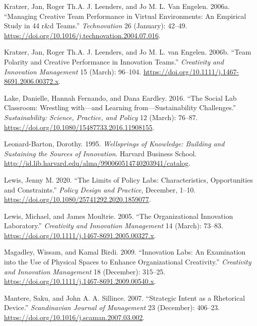 \documentclass[AMA,STIX1COL,APA,STIX2COL]{WileyNJD-v2}
\newlength{\cslhangindent}
\newenvironment{CSLReferences}[2] %
 {%
  \setlength{\parindent}{0pt}
  \ifodd #1 \everypar{\setlength{\hangindent}{\cslhangindent}}\ignorespaces\fi
  \ifnum #2 > 0
  \setlength{\parskip}{#2\baselineskip}
  \fi
 }%
 {}
\begin{document}
\begin{CSLReferences}{1}{0}
\leavevmode{}%
Kratzer, Jan, Roger Th.A. J. Leenders, and Jo M. L. Van Engelen. 2006a.
{``Managing Creative Team Performance in Virtual Environments: An
Empirical Study in 44 r\&d Teams.''} \emph{Technovation} 26 (January):
42--49. \url{https://doi.org/10.1016/j.technovation.2004.07.016}.

\leavevmode{}%
Kratzer, Jan, Roger Th.A. J. Leenders, and Jo M. L. van Engelen. 2006b.
{``Team Polarity and Creative Performance in Innovation Teams.''}
\emph{Creativity and Innovation Management} 15 (March): 96--104.
\url{https://doi.org/10.1111/j.1467-8691.2006.00372.x}.

\leavevmode{}%
Lake, Danielle, Hannah Fernando, and Dana Eardley. 2016. {``The Social
Lab Classroom: Wrestling with---and Learning from---Sustainability
Challenges.''} \emph{Sustainability: Science, Practice, and Policy} 12
(March): 76--87. \url{https://doi.org/10.1080/15487733.2016.11908155}.

\leavevmode{}%
Leonard-Barton, Dorothy. 1995. \emph{Wellsprings of Knowledge: Building
and Sustaining the Sources of Innovation}. Harvard Business School.
\url{http://id.lib.harvard.edu/alma/990060514740203941/catalog}.

\leavevmode{}%
Lewis, Jenny M. 2020. {``The Limits of Policy Labs: Characteristics,
Opportunities and Constraints.''} \emph{Policy Design and Practice},
December, 1--10. \url{https://doi.org/10.1080/25741292.2020.1859077}.

\leavevmode{}%
Lewis, Michael, and James Moultrie. 2005. {``The Organizational
Innovation Laboratory.''} \emph{Creativity and Innovation Management} 14
(March): 73--83. \url{https://doi.org/10.1111/j.1467-8691.2005.00327.x}.

\leavevmode{}%
Magadley, Wissam, and Kamal Birdi. 2009. {``Innovation Labs: An
Examination into the Use of Physical Spaces to Enhance Organizational
Creativity.''} \emph{Creativity and Innovation Management} 18
(December): 315--25.
\url{https://doi.org/10.1111/j.1467-8691.2009.00540.x}.

\leavevmode{}%
Mantere, Saku, and John A. A. Sillince. 2007. {``Strategic Intent as a
Rhetorical Device.''} \emph{Scandinavian Journal of Management} 23
(December): 406--23. \url{https://doi.org/10.1016/j.scaman.2007.03.002}.


\end{CSLReferences}
\end{document}
